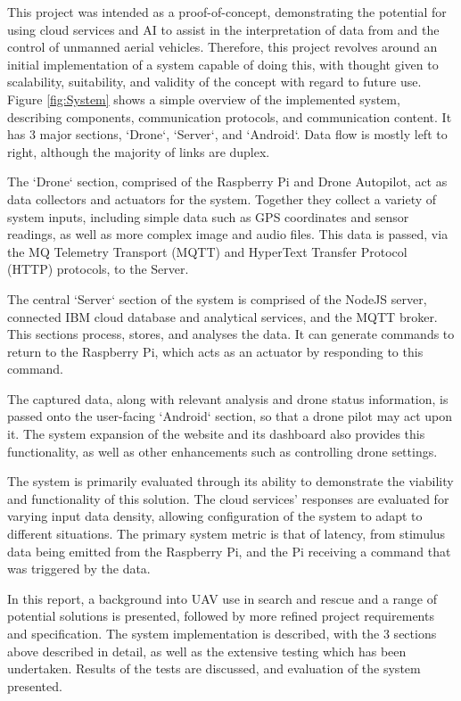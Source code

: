 \documentclass{article}
\begin{document}
This project was intended as a proof-of-concept, demonstrating the potential for using cloud services and AI to assist in the interpretation of data from and the control of unmanned aerial vehicles. Therefore, this project revolves around an initial implementation of a system capable of doing this, with thought given to scalability, suitability, and validity of the concept with regard to future use. Figure \ref{fig:System} shows a simple overview of the implemented system, describing components, communication protocols, and communication content. It has 3 major sections, `Drone`, `Server`, and `Android`. Data flow is mostly left to right, although the majority of links are duplex. 

The `Drone` section, comprised of the Raspberry Pi and Drone Autopilot, act as data collectors and actuators for the system. Together they collect a variety of system inputs, including simple data such as GPS coordinates and sensor readings, as well as more complex image and audio files. This data is passed, via the MQ Telemetry Transport (MQTT) and HyperText Transfer Protocol (HTTP) protocols, to the Server. 

The central `Server` section of the system is comprised of the NodeJS server, connected IBM cloud database and analytical services, and the MQTT broker. This sections process, stores, and analyses the data. It can generate commands to return to the Raspberry Pi, which acts as an actuator by responding to this command. 

The captured data, along with relevant analysis and drone status information, is passed onto the user-facing `Android` section, so that a drone pilot may act upon it. The system expansion of the website and its dashboard also provides this functionality, as well as other enhancements such as controlling drone settings.

The system is primarily evaluated through its ability to demonstrate the viability and functionality of this solution. The cloud services' responses are evaluated for varying input data density, allowing configuration of the system to adapt to different situations. The primary system metric is that of latency, from stimulus data being emitted from the Raspberry Pi, and the Pi receiving a command that was triggered by the data. 

In this report, a background into UAV use in search and rescue and a range of potential solutions is presented, followed by more refined project requirements and specification. The system implementation is described, with the 3 sections above described in detail, as well as the extensive testing which has been undertaken. Results of the tests are discussed, and evaluation of the system presented. 
\end{document}
